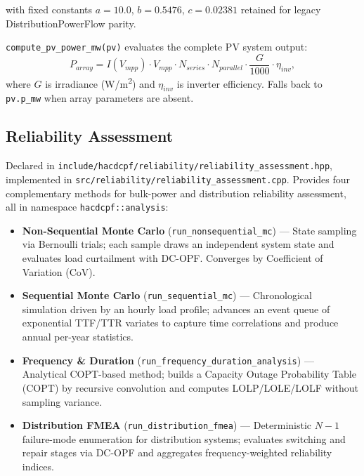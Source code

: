 with fixed constants $a = 10.0$, $b = 0.5476$, $c = 0.02381$ retained for
legacy DistributionPowerFlow parity.

\texttt{compute\_pv\_power\_mw(pv)} evaluates the complete PV system output:
\begin{equation}
  P_{array} = I(V_{mpp}) \cdot V_{mpp} \cdot N_{series} \cdot N_{parallel}
              \cdot \frac{G}{1000} \cdot \eta_{inv},
\end{equation}
where $G$ is irradiance (W/m\textsuperscript{2}) and $\eta_{inv}$ is inverter
efficiency.  Falls back to \texttt{pv.p\_mw} when array parameters are absent.

\subsection{Reliability Assessment}
\label{sec:reliability}

Declared in \texttt{include/hacdcpf/reliability/reliability\_assessment.hpp},
implemented in \texttt{src/reliability/reliability\_assessment.cpp}.  Provides
four complementary methods for bulk-power and distribution reliability
assessment, all in namespace \texttt{hacdcpf::analysis}:

\begin{itemize}
  \item \textbf{Non-Sequential Monte Carlo} (\texttt{run\_nonsequential\_mc}) ---
        State sampling via Bernoulli trials; each sample draws an independent
        system state and evaluates load curtailment with DC-OPF.  Converges by
        Coefficient of Variation (CoV).
  \item \textbf{Sequential Monte Carlo} (\texttt{run\_sequential\_mc}) ---
        Chronological simulation driven by an hourly load profile; advances an
        event queue of exponential TTF/TTR variates to capture time correlations
        and produce annual per-year statistics.
  \item \textbf{Frequency \& Duration} (\texttt{run\_frequency\_duration\_analysis}) ---
        Analytical COPT-based method; builds a Capacity Outage Probability Table
        (COPT) by recursive convolution and computes LOLP/LOLE/LOLF without
        sampling variance.
  \item \textbf{Distribution FMEA} (\texttt{run\_distribution\_fmea}) ---
        Deterministic $N-1$ failure-mode enumeration for distribution systems;
        evaluates switching and repair stages via DC-OPF and aggregates
        frequency-weighted reliability indices.
\end{itemize}

